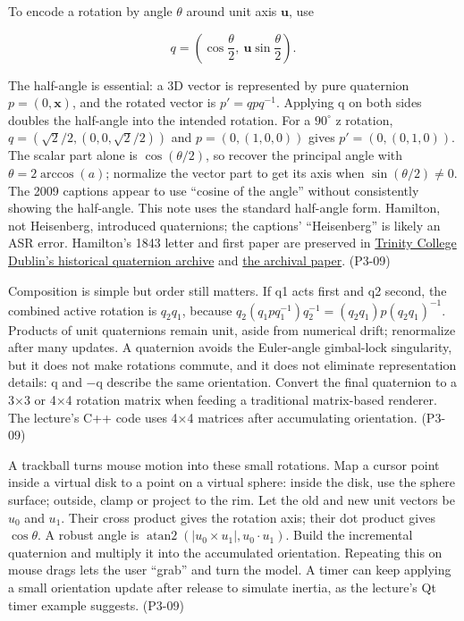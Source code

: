 To encode a rotation by angle \(\theta\) around unit axis \(\mathbf u\), use

\[
q=\left(\cos\frac{\theta}{2},\ \mathbf u\sin\frac{\theta}{2}\right).
\]

The half-angle is essential: a 3D vector is represented by pure quaternion \(p=(0,\mathbf x)\), and the rotated vector is \(p'=q p q^{-1}\). Applying q on both sides doubles the half-angle into the intended rotation. For a \(90^\circ\) z rotation, \(q=(\sqrt2/2,(0,0,\sqrt2/2))\) and \(p=(0,(1,0,0))\) gives \(p'=(0,(0,1,0))\). The scalar part alone is \(\cos(\theta/2)\), so recover the principal angle with \(\theta=2\arccos(a)\); normalize the vector part to get its axis when \(\sin(\theta/2)\ne0\). The 2009 captions appear to use ``cosine of the angle'' without consistently showing the half-angle. This note uses the standard half-angle form. Hamilton, not Heisenberg, introduced quaternions; the captions' ``Heisenberg'' is likely an ASR error. Hamilton's 1843 letter and first paper are preserved in \href{https://www.maths.tcd.ie/pub/HistMath/People/Hamilton/QLetter/}{Trinity College Dublin's historical quaternion archive} and \href{https://www.maths.tcd.ie/pub/HistMath/People/Hamilton/Quatern1/}{the archival paper}. (P3-09)

Composition is simple but order still matters. If q1 acts first and q2 second, the combined active rotation is \(q_2q_1\), because \(q_2(q_1pq_1^{-1})q_2^{-1}=(q_2q_1)p(q_2q_1)^{-1}\). Products of unit quaternions remain unit, aside from numerical drift; renormalize after many updates. A quaternion avoids the Euler-angle gimbal-lock singularity, but it does not make rotations commute, and it does not eliminate representation details: q and −q describe the same orientation. Convert the final quaternion to a 3×3 or 4×4 rotation matrix when feeding a traditional matrix-based renderer. The lecture's C++ code uses 4×4 matrices after accumulating orientation. (P3-09)

A trackball turns mouse motion into these small rotations. Map a cursor point inside a virtual disk to a point on a virtual sphere: inside the disk, use the sphere surface; outside, clamp or project to the rim. Let the old and new unit vectors be \(u_0\) and \(u_1\). Their cross product gives the rotation axis; their dot product gives \(\cos\theta\). A robust angle is \(\operatorname{atan2}(|u_0\times u_1|,u_0\cdot u_1)\). Build the incremental quaternion and multiply it into the accumulated orientation. Repeating this on mouse drags lets the user ``grab'' and turn the model. A timer can keep applying a small orientation update after release to simulate inertia, as the lecture's Qt timer example suggests. (P3-09)

